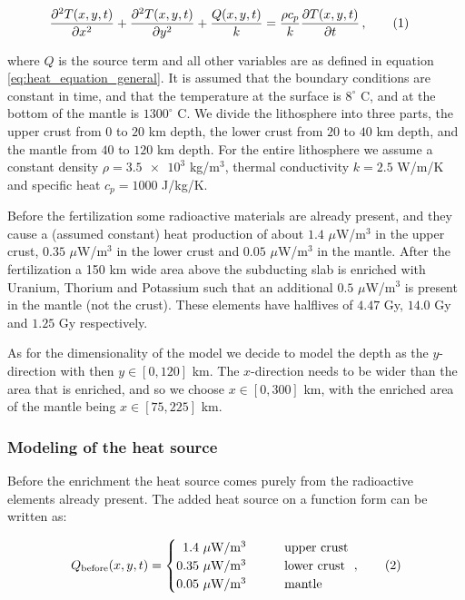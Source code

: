 \documentclass[reprint,english,notitlepage]{revtex4-1}  %
\newcommand\numberthis{\addtocounter{equation}{1}\tag{\theequation}}
\begin{document}
\begin{align*}
\frac{\partial^2 T(x,y,t)}{\partial x^2} + \frac{\partial^2 T(x,y,t)}{\partial y^2} + \frac{Q(x,y,t)}{k} &= \frac{\rho c_p}{k} \frac{\partial T(x,y,t)}{\partial t} \, , \numberthis \label{eq:heat_eq_with_source_term}
\end{align*} 

where $Q$ is the source term and all other variables are as defined in equation \eqref{eq:heat_equation_general}. It is assumed that the boundary conditions are constant in time, and that the temperature at the surface is $8^\circ$ C, and at the bottom of the mantle is $1300^\circ$ C. We divide the lithosphere into three parts, the upper crust from $0$ to $20$ km depth, the lower crust from $20$ to $40$ km depth, and the mantle from $40$ to $120$ km depth. For the entire lithosphere we assume a constant density $\rho = \num{3.5e3}$ kg/m$^3$, thermal conductivity $k = 2.5$ W/m/K and specific heat $c_p = 1000$ J/kg/K.

Before the fertilization some radioactive materials are already present, and they cause a (assumed constant) heat production of about $1.4$ $\mu$W/m$^3$ in the upper crust, $0.35$ $\mu$W/m$^3$ in the lower crust and $0.05$ $\mu$W/m$^3$ in the mantle. After the fertilization a 150 km wide area above the subducting slab is enriched with Uranium, Thorium and Potassium such that an additional $0.5$ $\mu$W/m$^3$ is present in the mantle (not the crust). These elements have halflives of $4.47$ Gy, $14.0$ Gy and $1.25$ Gy respectively.

As for the dimensionality of the model we decide to model the depth as the $y$-direction with then $y \in [0,120]$ km. The $x$-direction needs to be wider than the area that is enriched, and so we choose $x \in [0,300]$ km, with the enriched area of the mantle being $x \in [75,225]$ km. 


\subsubsection{Modeling of the heat source} \label{sec:formalism_heat_source_model}

Before the enrichment the heat source comes purely from the radioactive elements already present. The added heat source on a function form can be written as:

\begin{align*}
Q_\text{before}(x,y,t) = \begin{cases}
\,\,\, 1.4 \text{ $\mu$W/m$^3$} \quad  \quad  &\text{upper crust} \\
0.35 \text{ $\mu$W/m$^3$} \quad  \quad &\text{lower crust} \\
0.05 \text{ $\mu$W/m$^3$} \quad  \quad &\text{mantle}
\end{cases} \, , \numberthis \label{eq:unfertilized_heat}
\end{align*}
\end{document}
